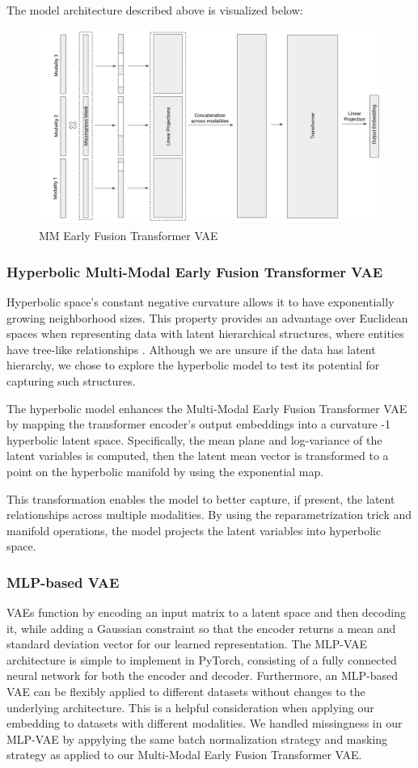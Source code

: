 \documentclass[11pt,a4paper]{article}
\begin{document}
The model architecture described above is visualized below:

\begin{figure}[H]
    \centering
    \includegraphics[width=0.5\linewidth]{Figure 2 Final.png}
    \caption{MM Early Fusion Transformer VAE}
    \label{fig:enter-label}
\end{figure}

\subsubsection{Hyperbolic Multi-Modal Early Fusion Transformer VAE }
Hyperbolic space's constant negative curvature allows it to have exponentially growing neighborhood sizes. This property provides an advantage over Euclidean spaces when representing data with latent hierarchical structures, where entities have tree-like relationships \cite{chami2020treescontinuousembeddingsback}. Although we are unsure if the data has latent hierarchy, we chose to explore the hyperbolic model to test its potential for capturing such structures.

The hyperbolic model enhances the Multi-Modal Early Fusion Transformer VAE by mapping the transformer encoder's output embeddings into a curvature -1 hyperbolic latent space. Specifically, the mean plane and log-variance of the latent variables is computed, then the latent mean vector is transformed to a point on the hyperbolic manifold by using the exponential map. 

This transformation enables the model to better capture, if present, the latent relationships across multiple modalities. By using the reparametrization trick and manifold operations, the model projects the latent variables into hyperbolic space.

\subsubsection{MLP-based VAE}
VAEs function by encoding an input matrix to a latent space and then decoding it, while adding a Gaussian constraint so that the encoder returns a mean and standard deviation vector for our learned representation. The MLP-VAE architecture is simple to implement in PyTorch, consisting of a fully connected neural network for both the encoder and decoder. Furthermore, an MLP-based VAE can be flexibly applied to different datasets without changes to the underlying architecture. This is a helpful consideration when applying our embedding to datasets with different modalities. We handled missingness in our MLP-VAE by appylying the same batch normalization strategy and masking strategy as applied to our Multi-Modal Early Fusion Transformer VAE.
\end{document}
